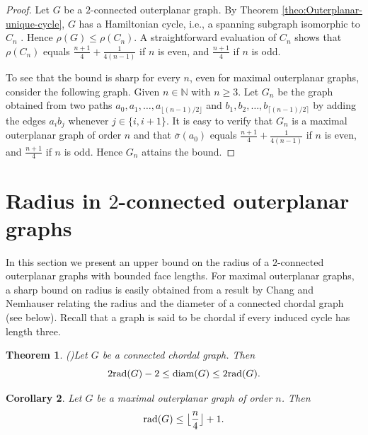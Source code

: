 \documentclass[a4paper,11pt]{article}
\newtheorem{theorem}{Theorem}[section]
\newtheorem{corollary}[theorem]%
{Corollary}
\numberwithin{equation}{theorem}
\begin{document}
\begin{proof}
Let $G$ be a $2$-connected outerplanar graph. 
By Theorem \ref{theo:Outerplanar-unique-cycle}, $G$ has a Hamiltonian cycle, i.e., a 
spanning subgraph isomorphic to $C_n$ . Hence 
$\rho(G) \leq \rho(C_n)$. A straightforward evaluation of $C_n$ shows that 
$\rho(C_n)$ equals $\frac{n+1}{4} + \frac{1}{4(n-1)}$ if $n$ is even,
and  $\frac{n+1}{4}$ if $n$ is odd. 

To see that the bound is sharp for every $n$, even for maximal outerplanar graphs,
consider the following graph. Given $n\in \mathbb{N}$ with $n\geq 3$. 
Let $G_n$ be the graph obtained from two paths
$a_0, a_1,\ldots,a_{\lfloor (n-1)/2 \rfloor}$ and 
$b_1, b_2,\ldots,b_{\lceil (n-1)/2 \rceil}$
by adding the edges $a_ib_j$ whenever $j \in \{i,i+1\}$. 
It is easy to verify that $G_n$ is a maximal outerplanar graph of order $n$
and that $\overline{\sigma}(a_0)$ equals $\frac{n+1}{4} + \frac{1}{4(n-1)}$ if $n$ is even,
and  $\frac{n+1}{4}$ if $n$ is odd. Hence $G_n$ attains the bound.
\end{proof}








\section{Radius in $2$-connected outerplanar graphs}
\label{section:radius}

In this section we present an upper bound on the radius of a $2$-connected outerplanar graphs with 
bounded face lengths. For maximal outerplanar graphs,  a sharp bound on 
radius is easily obtained from a result by Chang and Nemhauser \cite{ChaNem1984}
relating the radius and the diameter of a connected chordal graph (see below).  
Recall that a graph is said to be chordal if every induced cycle has length three. 



\begin{theorem}{\rm (\cite{ChaNem1984})}\label{theoremcn1984}
Let $G$ be a connected chordal graph. Then 
\[2{\rm rad}(G)-2\leq {\rm diam}(G)\leq 2{\rm rad}(G).\]
\end{theorem}



\begin{corollary}
Let $G$ be a maximal outerplanar graph of order $n$. Then
\[{\rm rad}(G) \leq \big\lfloor \dfrac{n}{4} \big\rfloor +1.\]
\end{corollary}
\end{document}
